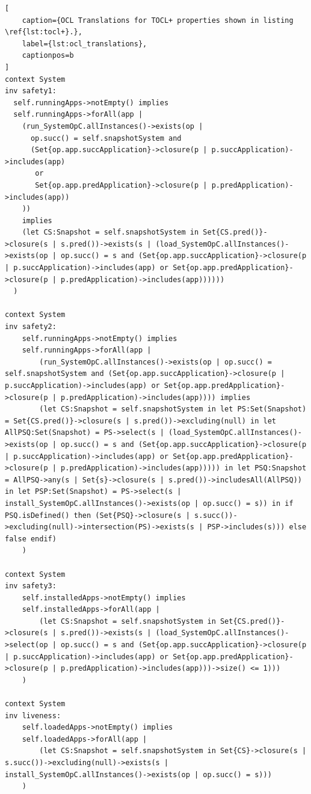 \begin{lstlisting}[
    caption={OCL Translations for TOCL+ properties shown in listing \ref{lst:tocl+}.},
    label={lst:ocl_translations},
    captionpos=b
]
context System
inv safety1:
  self.runningApps->notEmpty() implies
  self.runningApps->forAll(app |
    (run_SystemOpC.allInstances()->exists(op | 
      op.succ() = self.snapshotSystem and 
      (Set{op.app.succApplication}->closure(p | p.succApplication)->includes(app) 
       or 
       Set{op.app.predApplication}->closure(p | p.predApplication)->includes(app))
    )) 
    implies
    (let CS:Snapshot = self.snapshotSystem in Set{CS.pred()}->closure(s | s.pred())->exists(s | (load_SystemOpC.allInstances()->exists(op | op.succ() = s and (Set{op.app.succApplication}->closure(p | p.succApplication)->includes(app) or Set{op.app.predApplication}->closure(p | p.predApplication)->includes(app))))))
  )

context System
inv safety2:
    self.runningApps->notEmpty() implies
    self.runningApps->forAll(app |
        (run_SystemOpC.allInstances()->exists(op | op.succ() = self.snapshotSystem and (Set{op.app.succApplication}->closure(p | p.succApplication)->includes(app) or Set{op.app.predApplication}->closure(p | p.predApplication)->includes(app)))) implies
        (let CS:Snapshot = self.snapshotSystem in let PS:Set(Snapshot) = Set{CS.pred()}->closure(s | s.pred())->excluding(null) in let AllPSQ:Set(Snapshot) = PS->select(s | (load_SystemOpC.allInstances()->exists(op | op.succ() = s and (Set{op.app.succApplication}->closure(p | p.succApplication)->includes(app) or Set{op.app.predApplication}->closure(p | p.predApplication)->includes(app))))) in let PSQ:Snapshot = AllPSQ->any(s | Set{s}->closure(s | s.pred())->includesAll(AllPSQ)) in let PSP:Set(Snapshot) = PS->select(s | install_SystemOpC.allInstances()->exists(op | op.succ() = s)) in if PSQ.isDefined() then (Set{PSQ}->closure(s | s.succ())->excluding(null)->intersection(PS)->exists(s | PSP->includes(s))) else false endif)
    )

context System
inv safety3:
    self.installedApps->notEmpty() implies
    self.installedApps->forAll(app |
        (let CS:Snapshot = self.snapshotSystem in Set{CS.pred()}->closure(s | s.pred())->exists(s | (load_SystemOpC.allInstances()->select(op | op.succ() = s and (Set{op.app.succApplication}->closure(p | p.succApplication)->includes(app) or Set{op.app.predApplication}->closure(p | p.predApplication)->includes(app)))->size() <= 1)))
    )

context System
inv liveness:
    self.loadedApps->notEmpty() implies
    self.loadedApps->forAll(app |
        (let CS:Snapshot = self.snapshotSystem in Set{CS}->closure(s | s.succ())->excluding(null)->exists(s | install_SystemOpC.allInstances()->exists(op | op.succ() = s)))
    )


\end{lstlisting}
